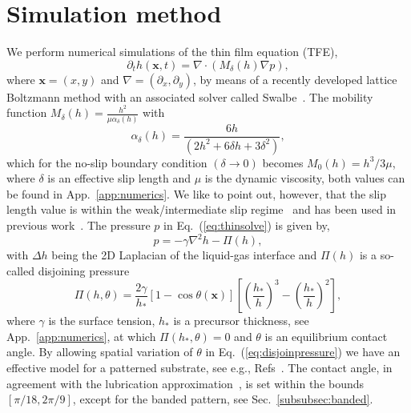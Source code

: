 \documentclass[twoside,twocolumn,9pt]{article}
\begin{document}
\section{Simulation method}
\label{sec:method}
We perform numerical simulations of the thin film equation (TFE),  
\begin{equation}\label{eq:thinsolve}
     \partial_t h(\mathbf{x},t) = \nabla\cdot\left(M_{\delta}(h)\nabla p\right),
\end{equation}
where $\mathbf{x} = (x,y)$ and $\nabla = (\partial_x, \partial_y)$, by means of a recently developed lattice Boltzmann method with an associated solver called Swalbe~\cite{zitzLatticeBoltzmannMethod2019, zitzLatticeBoltzmannSimulations2021, zitzSwalbeJlLattice2022, zitzControllingDewettingMorphologies2023}. 
The mobility function $M_{\delta}(h) = \frac{h^2}{\mu\alpha_{\delta}(h)}$ with 
\begin{equation}\label{eq:alphafric}
    \alpha_{\delta}(h) = \frac{6h}{(2 h^2 + 6 \delta h + 3 \delta^2)},
\end{equation}
which for the no-slip boundary condition $(\delta \rightarrow 0)$ becomes $M_{0}(h) = h^3/3\mu$, where $\delta$ is an effective slip length and $\mu$ is the dynamic viscosity, both values can be found in App.~\ref{app:numerics}.
We like to point out, however, that the slip length value is within the weak/intermediate slip regime~\cite{peschkaSignaturesSlipDewetting2019,fetzerQuantifyingHydrodynamicSlip2007, munchLubricationModelsSmall2005} and has been used in previous work~\cite{zitzControllingDewettingMorphologies2023}.
The pressure $p$ in Eq.~(\ref{eq:thinsolve}) is given by,
\begin{equation}\label{eq:filmpressure}
    p = - \gamma\nabla^2 h -\Pi(h),
\end{equation}
with $\Delta h$ being the 2D Laplacian of the liquid-gas interface and $\Pi(h)$ is a so-called disjoining pressure~\cite{schwartzSimulationDropletMotion1998, crasterDynamicsStabilityThin2009, nguyenCompetitionCollapseBreakup2012, gonzalezStabilityLiquidRing2013}
\begin{equation}\label{eq:disjoinpressure}
    \Pi(h,\theta) = \frac{2\gamma}{h_{\ast}}[1-\cos\theta(\mathbf{x})]\left[\left(\frac{h_*}{h}\right)^3 -\left(\frac{h_*}{h}\right)^2\right],
\end{equation}
where $\gamma$ is the surface tension, $h_{\ast}$ is a precursor thickness, see App.~\ref{app:numerics}, at which $\Pi(h_{\ast}, \theta) = 0$ and $\theta$ is an equilibrium contact angle.
By allowing spatial variation of $\theta$ in Eq.~(\ref{eq:disjoinpressure}) we have an effective model for a patterned substrate, see e.g., Refs~\cite{zitzLatticeBoltzmannSimulations2021, zitzControllingDewettingMorphologies2023}. 
The contact angle, in agreement with the lubrication approximation~\cite{oronLongscaleEvolutionThin1997, crasterDynamicsStabilityThin2009}, is set within the bounds $[\pi/18, 2\pi/9]$, except for the banded pattern, see Sec.~\ref{subsubsec:banded}. 
\end{document}
